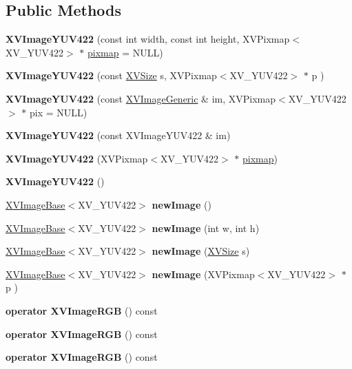 \subsection*{Public Methods}
\begin{CompactItemize}
\item 
{\bf XVImage\-YUV422} (const int width, const int height, XVPixmap$<$XV\_\-YUV422$>$ $\ast$ \hyperlink{class_XVImageBase_n1}{pixmap} = NULL)
\item 
{\bf XVImage\-YUV422} (const \hyperlink{class_XVSize}{XVSize} s, XVPixmap$<$XV\_\-YUV422$>$ $\ast$ p )
\item 
{\bf XVImage\-YUV422} (const \hyperlink{class_XVImageGeneric}{XVImage\-Generic} \& im, XVPixmap$<$XV\_\-YUV422$>$ $\ast$ pix = NULL)
\item 
{\bf XVImage\-YUV422} (const XVImage\-YUV422 \& im)
\item 
{\bf XVImage\-YUV422} (XVPixmap$<$XV\_\-YUV422$>$ $\ast$ \hyperlink{class_XVImageBase_n1}{pixmap})
\item 
{\bf XVImage\-YUV422} ()
\item 
\hyperlink{class_XVImageBase}{XVImage\-Base}$<$XV\_\-YUV422$>$ {\bf new\-Image} ()
\item 
\hyperlink{class_XVImageBase}{XVImage\-Base}$<$XV\_\-YUV422$>$ {\bf new\-Image} (int w, int h)
\item 
\hyperlink{class_XVImageBase}{XVImage\-Base}$<$XV\_\-YUV422$>$ {\bf new\-Image} (\hyperlink{class_XVSize}{XVSize} s)
\item 
\hyperlink{class_XVImageBase}{XVImage\-Base}$<$XV\_\-YUV422$>$ {\bf new\-Image} (XVPixmap$<$XV\_\-YUV422$>$ $\ast$ p )
\item 
\label{XVImageYUV422_a10}
\hypertarget{class_XVImageYUV422_a10}{
{\bf operator XVImage\-RGB} () const}

\item 
\label{XVImageYUV422_a11}
\hypertarget{class_XVImageYUV422_a11}{
{\bf operator XVImage\-RGB} () const}

\item 
\label{XVImageYUV422_a12}
\hypertarget{class_XVImageYUV422_a12}{
{\bf operator XVImage\-RGB} () const}


\end{CompactItemize}
